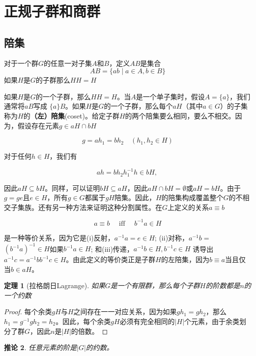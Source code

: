 \documentclass[hyperref,UTF8]{ctexbook}
\newtheorem{theorem}{定理}[chapter]
\newtheorem{corollary}[theorem]{推论}
\begin{document}
\section{正规子群和商群}
\subsection{陪集}
对于一个群\(G\)的任意一对子集\(A\)和\(B\)，定义\(AB\)是集合
$$A B=\{a b \mid a \in A,b \in B\}$$
如果\(H\)是\(G\)的子群那么\(HH=H\)

如果$H$是$G$的一个子群，那么$HH=H$。当$A$是一个单子集时，假设$A=\{a\}$，我们通常将$aB$写成 $\{a\}B$。如果$H$是$G$的一个子群，那么每个$a H$（其中$a \in G$）的子集称为$H$的\textbf{（左）陪集}(coset)。给定子群$H$的两个陪集要么相同，要么不相交。因为，假设存在元素$g \in aH \cap bH$

$$g=a h_{1}=b h_{2} \quad\left(h_{1}, h_{2} \in H\right)$$

对于任何$h \in H$，我们有

$$
a h=b h_{2} h_{1}^{-1} h \in b H \text {, }
$$

因此$a H \subseteq b H$。同样，可以证明$b H \subseteq a H$，因此$a H \cap b H=\emptyset$或$a H=b H$。由于$g=ge$且$e \in H$，所有$g \in G$都属于$gH$陪集。因此，$H$的陪集构成覆盖整个$G$的不相交子集族。还有另一种方法来证明这种分割属性。在$G$上定义的关系$a \equiv b$

$$
a \equiv b \quad \text { iff } \quad b^{-1} a \in H
$$

是一种等价关系，因为它是(i)反射，$a^{-1} a=e \in H$; (ii)对称，$a^{-1} b=$ $\left(b^{-1} a\right)^{-1} \in H$如果$b^{-1} a \in H$; 和(iii)传递，$a^{-1} b \in H, b^{-1} c \in H$ 诱导出 $a^{-1} c=a^{-1} b b^{-1} c \in H$。由此定义的等价类正是子群$H$的左陪集，因为$b \equiv a$当且仅当$b \in a H$。

\begin{theorem}[拉格朗日Lagrange]\label{thm:lagrange}
    如果$G$是一个有限群，那么每个子群$H$的阶数都是$n$的一个约数
\end{theorem}
    \begin{proof}
    每个余类$gH$与$H$之间存在一一对应关系，因为如果$gh_1=gh_2$，那么$h_1=g^{-1}gh_2=h_2$。因此，每个余类$gH$必须有完全相同的$|H|$个元素，由于余类划分了群$G$，因此$n$是$|H|$的倍数。
\end{proof}
    
    \begin{corollary}
        任意元素的阶是$|G|$的约数。
    \end{corollary}
    
\end{document}
